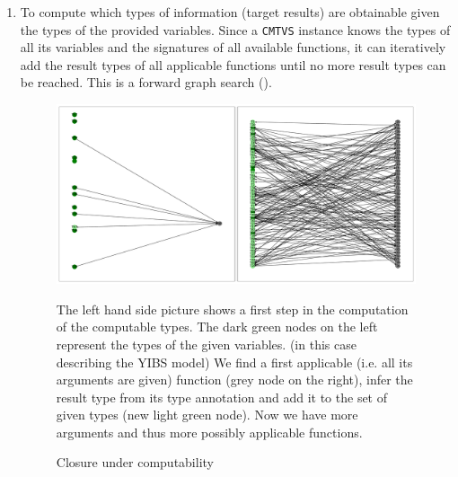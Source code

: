 \begin{enumerate}
  \item
  \label{enum:computable}
  To compute which types of information (target results) are obtainable given the types of the provided variables. 
  Since a \texttt{CMTVS} instance knows the types of all its variables and the signatures of all
  available functions, it can iteratively add the result types of all applicable functions until no
  more result types can be reached. This is a forward graph search ().
    \begin{figure}[h]
      \includegraphics[width=\textwidth]{closure.pdf}
      \caption{Closure under computability} 

      The left hand side picture shows a first step in the computation of the
      computable types.  
      The dark green nodes on the left represent the types of the given variables.
      (in this case describing the YIBS model)
      We find a first applicable (i.e. all its arguments are
      given) function (grey node on the right), infer the result type from its
      type annotation and add it to the set of given types (new light green
      node).  Now we have more arguments and thus more possibly applicable
      functions.


\end{figure}
\end{enumerate}
